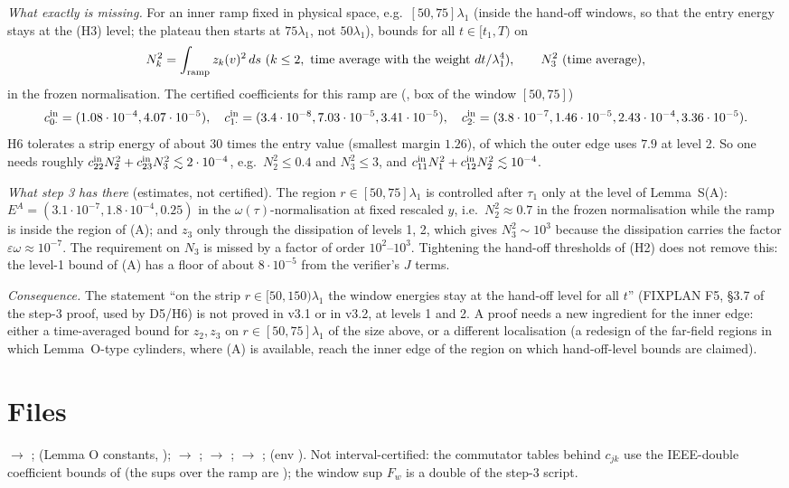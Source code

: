 \documentclass[11pt]{article}
\begin{document}
\emph{What exactly is missing.} For an inner ramp fixed in physical space, e.g.\ $[50,75]\lambda_1$ (inside the hand-off windows, so that the entry energy stays at the (H3) level; the plateau then starts at $75\lambda_1$, not $50\lambda_1$), bounds for all $t\in[t_1,T)$ on
\[N_k^2=\int_{\rm ramp}z_k(v)^2\,ds\ (k\le2,\ \text{time average with the weight }dt/\lambda_1^4),\qquad N_3^2\ (\text{time average}),\]
in the frozen normalisation. The certified coefficients for this ramp are (, box of the window $[50,75]$)
\[c^{\rm in}_{0\cdot}=(1.08\cdot10^{-4},4.07\cdot10^{-5}),\quad c^{\rm in}_{1\cdot}=(3.4\cdot10^{-8},7.03\cdot10^{-5},3.41\cdot10^{-5}),\quad c^{\rm in}_{2\cdot}=(3.8\cdot10^{-7},1.46\cdot10^{-5},2.43\cdot10^{-4},3.36\cdot10^{-5}).\]
H6 tolerates a strip energy of about $30$ times the entry value (smallest margin $1.26$), of which the outer edge uses $7.9$ at level 2. So one needs roughly $c^{\rm in}_{22}N_2^2+c^{\rm in}_{23}N_3^2\lesssim2\cdot10^{-4}$, e.g.\ $N_2^2\le0.4$ and $N_3^2\le3$, and $c^{\rm in}_{11}N_1^2+c^{\rm in}_{12}N_2^2\lesssim10^{-4}$.

\emph{What step 3 has there} (estimates, not certified). The region $r\in[50,75]\lambda_1$ is controlled after $\tau_1$ only at the level of Lemma~S(A): $E^A=(3.1\cdot10^{-7},1.8\cdot10^{-4},0.25)$ in the $\omega(\tau)$-normalisation at fixed rescaled $y$, i.e.\ $N_2^2\approx0.7$ in the frozen normalisation while the ramp is inside the region of (A); and $z_3$ only through the dissipation of levels 1, 2, which gives $N_3^2\sim10^3$ because the dissipation carries the factor $\varepsilon\omega\approx10^{-7}$. The requirement on $N_3$ is missed by a factor of order $10^2$--$10^3$. Tightening the hand-off thresholds of (H2) does not remove this: the level-1 bound of (A) has a floor of about $8\cdot10^{-5}$ from the verifier's $J$ terms.

\emph{Consequence.} The statement ``on the strip $r\in[50,150)\lambda_1$ the window energies stay at the hand-off level for all $t$'' (FIXPLAN F5, \S3.7 of the step-3 proof, used by D5/H6) is not proved in v3.1 or in v3.2, at levels 1 and 2. A proof needs a new ingredient for the inner edge: either a time-averaged bound for $z_2,z_3$ on $r\in[50,75]\lambda_1$ of the size above, or a different localisation (a redesign of the far-field regions in which Lemma~O-type cylinders, where (A) is available, reach the inner edge of the region on which hand-off-level bounds are claimed).

\section{Files}
 $\to$ ;  (Lemma O constants, );  $\to$ ;  $\to$ ;  $\to$ ;  (env ).
Not interval-certified: the commutator tables behind $c_{jk}$ use the IEEE-double coefficient bounds of  (the sups over the ramp are ); the window sup $F_w$ is a double of the step-3 script.
\end{document}
